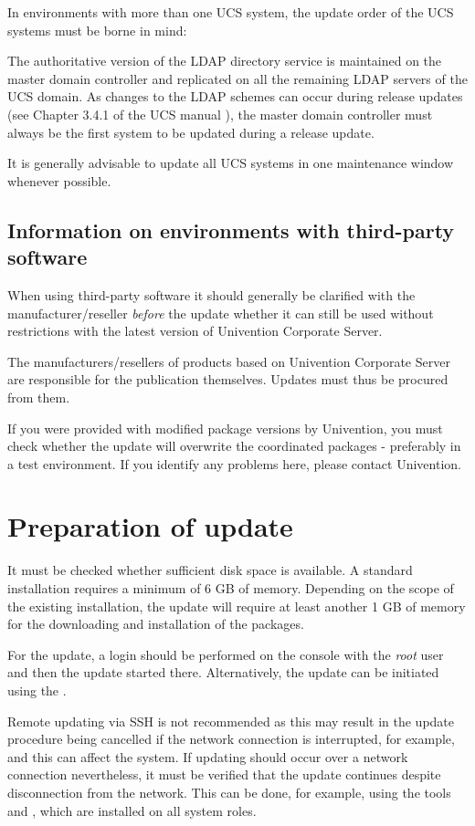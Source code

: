 In environments with more than one UCS system, the update order of the
UCS systems must be borne in mind:

The authoritative version of the LDAP directory service
is maintained on the master domain controller and replicated on all the remaining
LDAP servers of the UCS domain. As changes to the LDAP schemes can
occur during release updates (see Chapter 3.4.1 of the UCS
manual \cite{UCS-Handbuch}), the master domain controller must always be the first
system to be updated during a release update.

It is generally advisable to update all UCS systems in one maintenance
window whenever possible. 

\section{Information on environments with third-party software}

When using third-party software it should generally be clarified with
the manufacturer/reseller \emph{before} the update whether it can still
be used without restrictions with the latest version of Univention
Corporate Server. 

The manufacturers/resellers of products based on Univention Corporate
Server are responsible for the publication themselves. Updates must
thus be procured from them.

If you were provided with modified package versions by Univention,
you must check whether the update will overwrite the coordinated
packages - preferably in a test environment. If you identify any
problems here, please contact Univention.


\chapter{Preparation of update}
It must be checked whether sufficient disk space is available. A
standard installation requires a minimum of 6 GB of memory. Depending
on the scope of the existing installation, the update will require at
least another 1 GB of memory for the downloading and installation of
the packages.

For the update, a login should be performed on the console with
the \emph{root} user and then the update started there. Alternatively,
the update can be initiated using the \ucsUMC{}.

Remote updating via SSH is not recommended as this may result in the
update procedure being cancelled if the network connection is
interrupted, for example, and this can affect the system. If updating
should occur over a network connection nevertheless, it must be
verified that the update continues despite disconnection from the
network. This can be done, for example, using the
tools  and , which are installed on
all system roles.



